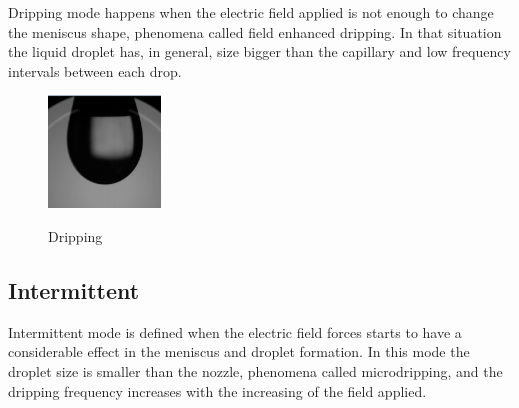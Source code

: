 Dripping mode happens when the electric field applied is not enough to change the meniscus shape, phenomena called field enhanced dripping.
In that situation the liquid droplet has, in general, size bigger than the capillary and low frequency intervals between each drop.

\begin{figure}[H]
  \center
  \includegraphics[width=3cm]{Figuras/19:03/drip_example.png}
  \label{fig:drip_example}
  \caption{Dripping}
\end{figure}

\subsection{Intermittent}
\label{subsec:Intermittent}

Intermittent mode is defined when the electric field forces starts to have a considerable effect in the meniscus and droplet formation. 
In this mode the droplet size is smaller than the nozzle, phenomena called microdripping, and the dripping frequency increases with the increasing of the field applied.

